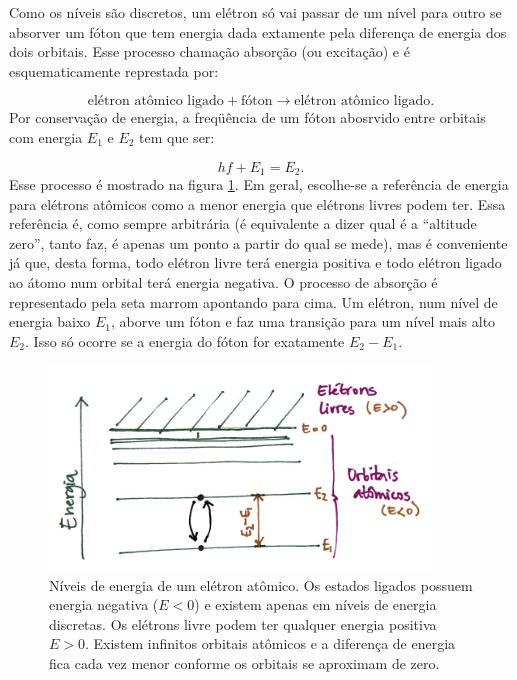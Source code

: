 \documentclass{article}
\begin{document}
Como os n\'iveis s\~ao discretos, um el\'etron s\'o vai passar de um n\'ivel para outro se absorver um f\'oton que tem energia dada extamente pela diferen\c ca de energia dos dois orbitais. Esse processo chama\c c\~ao absor\c c\~ao (ou excita\c c\~ao) e \'e esquematicamente represtada por:

\begin{equation}
\text{el\'etron at\^omico ligado} + \text{f\'oton} \rightarrow \text{el\'etron at\^omico ligado}.
\end{equation}
Por conserva\c c\~ao de energia, a freq\"u\^encia de um f\'oton abosrvido entre orbitais com energia $E_1$ e $E_2$ tem que ser:

\begin{equation}
hf + E_1 = E_2.
\end{equation}
Esse processo \'e mostrado na figura \ref{fig:atom}. Em geral, escolhe-se a refer\^encia de energia para el\'etrons at\^omicos como a menor energia que el\'etrons livres podem ter. Essa refer\^encia \'e, como sempre arbitr\'aria (\'e equivalente a dizer qual \'e a ``altitude zero'', tanto faz, \'e apenas um ponto a partir do qual se mede), mas \'e conveniente j\'a que, desta forma, todo el\'etron livre ter\'a energia positiva e todo el\'etron ligado ao \'atomo num orbital ter\'a energia negativa. O processo de absor\c c\~ao \'e representado pela seta marrom apontando para cima. Um el\'etron, num n\'ivel de energia baixo $E_1$, aborve um f\'oton e faz uma transi\c c\~ao para um n\'ivel mais alto $E_2$. Isso s\'o ocorre se a energia do f\'oton for exatamente $E_2-E_1$.

\begin{figure}[ht]
\includegraphics[width=0.9\textwidth]{atom.png}
\caption{\label{fig:atom}N\'iveis de energia de um el\'etron at\^omico. Os estados ligados possuem energia negativa ($E<0$) e existem apenas em n\'iveis de energia discretas. Os el\'etrons livre podem ter qualquer energia positiva $E>0$. Existem infinitos orbitais at\^omicos e a diferen\c ca de energia fica cada vez menor conforme os orbitais se aproximam de zero.}
\end{figure}
\end{document}
